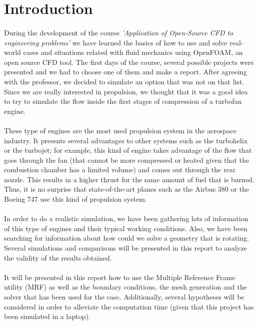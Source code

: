 \section{Introduction}

\paragraph{}During the development of the course \textit{'Application of Open-Source CFD to engineering problems'} we have learned the basics of how to use and solve real-world cases and situations related with fluid mechanics using OpenFOAM, an open source CFD tool. The first days of the course, several possible projects were presented and we had to choose one of them and make a report. After agreeing with the professor, we decided to simulate an option that was not on that list. Since we are really interested in propulsion, we thought that it was a good idea to try to simulate the flow inside the first stages of compression of a turbofan engine.

\paragraph{}These type of engines are the most used propulsion system in the aerospace industry. It presents several advantages to other systems such as the turbohelix or the turbojet; for example, this kind of engine takes advantage of the flow that goes through the fan (that cannot be more compressed or heated given that the combustion chamber has a limited volume) and comes out through the rear nozzle. This results in a higher thrust for the same amount of fuel that is burned. Thus, it is no surprise that state-of-the-art planes such as the Airbus 380 or the Boeing 747 use this kind of propulsion system.

\paragraph{}In order to do a realistic simulation, we have been gathering lots of information of this type of engines and their typical working conditions. Also, we have been searching for information about how could we solve a geometry that is rotating. Several simulations and comparisons will be presented in this report to analyze the validity of the results obtained. 

\paragraph{}It will be presented in this report how to use the Multiple Reference Frame utility (MRF) as well as the boundary conditions, the mesh generation and the solver that has been used for the case. Additionally, several hypotheses will be considered in order to alleviate the computation time (given that this project has been simulated in a laptop).

